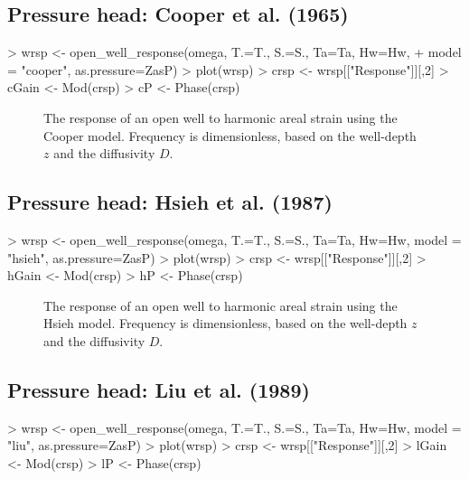 \documentclass[12pt]{article}
\begin{document}
\subsection{Pressure head: Cooper et al. (1965)}

\begin{Schunk}
\begin{Sinput}
> wrsp <- open_well_response(omega, T.=T., S.=S., Ta=Ta, Hw=Hw, 
+ 	model = "cooper", as.pressure=ZasP)
> plot(wrsp)
> crsp <- wrsp[["Response"]][,2]
> cGain <- Mod(crsp)
> cP <- Phase(crsp)
\end{Sinput}
\end{Schunk}

\begin{figure}[htb!]
\begin{center}
\caption{The response of an open well to harmonic areal strain using
the Cooper model. 
Frequency is dimensionless, based on the well-depth $z$ and the diffusivity $D$.
}
\label{fig:owrsp-coop}
\end{center}
\end{figure}

\clearpage
\subsection{Pressure head: Hsieh et al. (1987)}

\begin{Schunk}
\begin{Sinput}
> wrsp <- open_well_response(omega, T.=T., S.=S.,  Ta=Ta, Hw=Hw, model = "hsieh", as.pressure=ZasP)
> plot(wrsp)
> crsp <- wrsp[["Response"]][,2]
> hGain <- Mod(crsp)
> hP <- Phase(crsp)
\end{Sinput}
\end{Schunk}

\begin{figure}[htb!]
\begin{center}
\caption{The response of an open well to harmonic areal strain using
the Hsieh model. 
Frequency is dimensionless, based on the well-depth $z$ and the diffusivity $D$.
}
\label{fig:owrsp-hsi}
\end{center}
\end{figure}

\clearpage
\subsection{Pressure head: Liu et al. (1989)}

\begin{Schunk}
\begin{Sinput}
> wrsp <- open_well_response(omega, T.=T., S.=S.,  Ta=Ta, Hw=Hw, model = "liu", as.pressure=ZasP)
> plot(wrsp)
> crsp <- wrsp[["Response"]][,2]
> lGain <- Mod(crsp)
> lP <- Phase(crsp)
\end{Sinput}
\end{Schunk}
\end{document}
